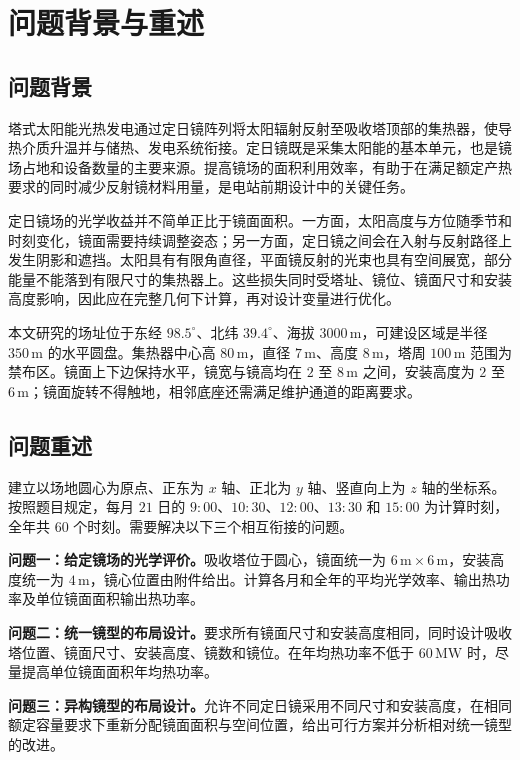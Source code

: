 \section{问题背景与重述}
\subsection{问题背景}
塔式太阳能光热发电通过定日镜阵列将太阳辐射反射至吸收塔顶部的集热器，使导热介质升温并与储热、发电系统衔接。定日镜既是采集太阳能的基本单元，也是镜场占地和设备数量的主要来源。提高镜场的面积利用效率，有助于在满足额定产热要求的同时减少反射镜材料用量，是电站前期设计中的关键任务\cite{problem,zhang}。

定日镜场的光学收益并不简单正比于镜面面积。一方面，太阳高度与方位随季节和时刻变化，镜面需要持续调整姿态；另一方面，定日镜之间会在入射与反射路径上发生阴影和遮挡。太阳具有有限角直径，平面镜反射的光束也具有空间展宽，部分能量不能落到有限尺寸的集热器上。这些损失同时受塔址、镜位、镜面尺寸和安装高度影响，因此应在完整几何下计算，再对设计变量进行优化。

本文研究的场址位于东经 $98.5^\circ$、北纬 $39.4^\circ$、海拔 $3000\,\mathrm m$，可建设区域是半径 $350\,\mathrm m$ 的水平圆盘。集热器中心高 $80\,\mathrm m$，直径 $7\,\mathrm m$、高度 $8\,\mathrm m$，塔周 $100\,\mathrm m$ 范围为禁布区。镜面上下边保持水平，镜宽与镜高均在 $2$ 至 $8\,\mathrm m$ 之间，安装高度为 $2$ 至 $6\,\mathrm m$；镜面旋转不得触地，相邻底座还需满足维护通道的距离要求。

\subsection{问题重述}
建立以场地圆心为原点、正东为 $x$ 轴、正北为 $y$ 轴、竖直向上为 $z$ 轴的坐标系。按照题目规定，每月 $21$ 日的 $9{:}00$、$10{:}30$、$12{:}00$、$13{:}30$ 和 $15{:}00$ 为计算时刻，全年共 $60$ 个时刻。需要解决以下三个相互衔接的问题。

\textbf{问题一：给定镜场的光学评价。}吸收塔位于圆心，镜面统一为 $6\,\mathrm m\times6\,\mathrm m$，安装高度统一为 $4\,\mathrm m$，镜心位置由附件给出。计算各月和全年的平均光学效率、输出热功率及单位镜面面积输出热功率。

\textbf{问题二：统一镜型的布局设计。}要求所有镜面尺寸和安装高度相同，同时设计吸收塔位置、镜面尺寸、安装高度、镜数和镜位。在年均热功率不低于 $60\,\mathrm{MW}$ 时，尽量提高单位镜面面积年均热功率。

\textbf{问题三：异构镜型的布局设计。}允许不同定日镜采用不同尺寸和安装高度，在相同额定容量要求下重新分配镜面面积与空间位置，给出可行方案并分析相对统一镜型的改进。

